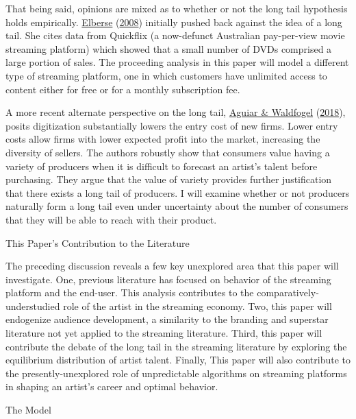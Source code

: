 \documentclass[
]{article}
\begin{document}
That being said, opinions are mixed as to whether or not the long tail
hypothesis holds empirically.
\protect\hyperlink{ref-elberseShouldYouInvest2008}{Elberse}
(\protect\hyperlink{ref-elberseShouldYouInvest2008}{2008}) initially
pushed back against the idea of a long tail. She cites data from
Quickflix (a now-defunct Australian pay-per-view movie streaming
platform) which showed that a small number of DVDs comprised a large
portion of sales. The proceeding analysis in this paper will model a
different type of streaming platform, one in which customers have
unlimited access to content either for free or for a monthly
subscription fee.

A more recent alternate perspective on the long tail,
\protect\hyperlink{ref-aguiarQualityPredictabilityWelfare2018}{Aguiar \&
Waldfogel}
(\protect\hyperlink{ref-aguiarQualityPredictabilityWelfare2018}{2018}),
posits digitization substantially lowers the entry cost of new firms.
Lower entry costs allow firms with lower expected profit into the
market, increasing the diversity of sellers. The authors robustly show
that consumers value having a variety of producers when it is difficult
to forecast an artist's talent before purchasing. They argue that the
value of variety provides further justification that there exists a long
tail of producers. I will examine whether or not producers naturally
form a long tail even under uncertainty about the number of consumers
that they will be able to reach with their product.

This Paper's Contribution to the Literature

The preceding discussion reveals a few key unexplored area that this
paper will investigate. One, previous literature has focused on behavior
of the streaming platform and the end-user. This analysis contributes to
the comparatively-understudied role of the artist in the streaming
economy. Two, this paper will endogenize audience development, a
similarity to the branding and superstar literature not yet applied to
the streaming literature. Third, this paper will contribute the debate
of the long tail in the streaming literature by exploring the
equilibrium distribution of artist talent. Finally, This paper will also
contribute to the presently-unexplored role of unpredictable algorithms
on streaming platforms in shaping an artist's career and optimal
behavior.

The Model
\end{document}
